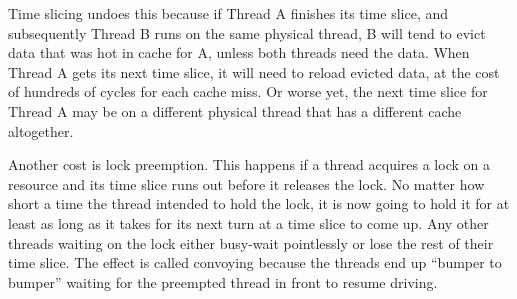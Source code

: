 Time slicing undoes this because if Thread A finishes its time slice,
and subsequently Thread B runs on the same physical thread, B will
tend to evict data that was hot in cache for A, unless both threads
need the data. When Thread A gets its next time slice, it will need to
reload evicted data, at the cost of hundreds of cycles for each cache
miss. Or worse yet, the next time slice for Thread A may be on a
different physical thread that has a different cache altogether.

Another cost is lock preemption. This happens if a thread acquires a
lock on a resource and its time slice runs out before it releases the
lock. No matter how short a time the thread intended to hold the lock,
it is now going to hold it for at least as long as it takes for its
next turn at a time slice to come up. Any other threads waiting on the
lock either busy-wait pointlessly or lose the rest of their time
slice. The effect is called convoying because the threads end up
``bumper to bumper'' waiting for the preempted thread in front to resume
driving.




